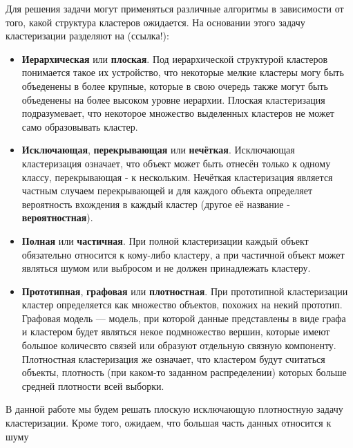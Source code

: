 \documentclass[12pt,fleqn]{article}
\begin{document}
Для решения задачи могут применяться различные алгоритмы в зависимости от того, какой структура кластеров ожидается. На основании этого задачу кластеризации разделяют на (ссылка!):
\begin{itemize}
\item \textbf{Иерархическая} или \textbf{плоская}. Под иерархической  структурой кластеров понимается такое их устройство, что некоторые мелкие кластеры могу быть объеденены в более крупные, которые в свою очередь также могут быть объеденены на более высоком уровне иерархии. Плоская кластеризация подразумевает, что некоторое множество выделенных кластеров не может само образовывать кластер.
\item \textbf{Исключающая}, \textbf{перекрывающая} или \textbf{нечёткая}. Исключающая кластеризация означает, что объект может быть отнесён только к одному классу, перекрывающая - к нескольким. Нечёткая кластеризация является частным случаем перекрывающей и для каждого объекта определяет вероятность вхождения в каждый кластер (другое её название - \textbf{вероятностная}).
\item \textbf{Полная} или \textbf{частичная}. При полной кластеризации каждый объект обязательно относится к кому-либо кластеру, а при частичной объект может являться шумом или выбросом и не должен принадлежать кластеру.
\item \textbf{Прототипная}, \textbf{графовая} или \textbf{плотностная}. При прототипной кластеризации кластер определяется как множество объектов, похожих на некий прототип. Графовая модель --- модель, при которой данные представлены в виде графа и кластером будет являться некое подмножество вершин, которые имеют большое количесвто связей или образуют отдельную связную компоненту. Плотностная кластеризация же означает, что кластером будут считаться объекты, плотность (при каком-то заданном распределении) которых больше средней плотности всей выборки.
\end{itemize}

В данной работе мы будем решать плоскую исключающую плотностную задачу кластеризации. Кроме того, ожидаем, что большая часть данных относится к шуму
\end{document}
